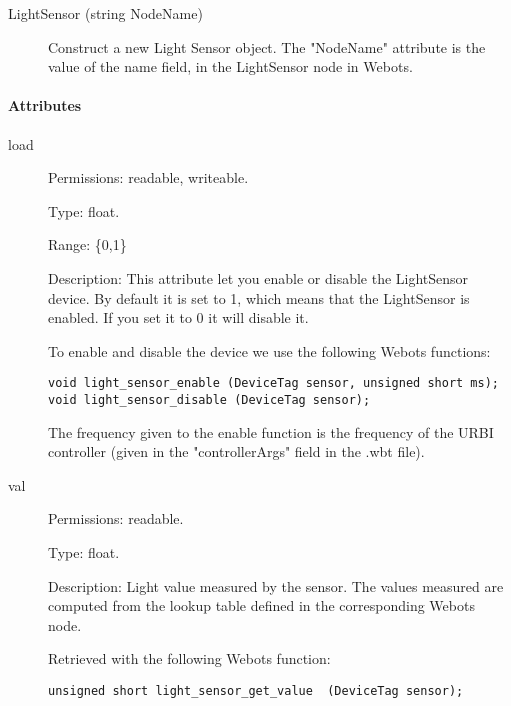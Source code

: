 \noindent
\begin{description}
\item[{LightSensor (string NodeName)}]            Construct a new Light Sensor object. The "NodeName" attribute is the value
          of the name field, in the LightSensor node in Webots.

\end{description}

\paragraph{Attributes}
\label{webots.uobjects.robotdevices.lightsensor.attributes}%

\noindent
\begin{description}
\item[{load}]     Permissions: readable, writeable.


  Type: float.


  Range: \{0,1\}


  Description: This attribute let you enable or disable the
  LightSensor device.  By default it is set to 1, which means that the
  LightSensor is enabled. If you set it to 0 it will disable it.


          To enable and disable the device we use the following Webots functions:


\begin{lstlisting}
void light_sensor_enable (DeviceTag sensor, unsigned short ms);
void light_sensor_disable (DeviceTag sensor);
\end{lstlisting}

          The frequency given to the enable function is the frequency of the
          URBI controller (given in the "controllerArgs" field in the .wbt file).

\item[{         val
 }]            Permissions: readable.


 Type: float.


 Description: Light value measured by the sensor. The values measured
 are computed from the lookup table defined in the corresponding
 Webots node.


          Retrieved with the following Webots function:


\begin{lstlisting}
unsigned short light_sensor_get_value  (DeviceTag sensor);
\end{lstlisting}
\end{description}

